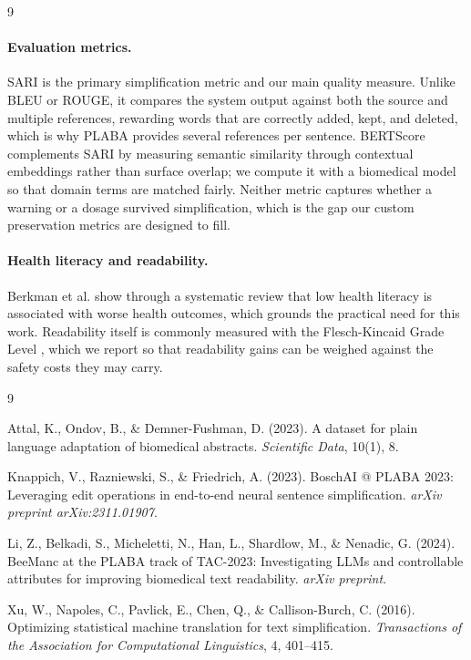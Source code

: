 \documentclass[11pt]{article}
\begin{document}
\begin{thebibliography}{9}
\paragraph{Evaluation metrics.}
SARI \cite{xu2016sari} is the primary simplification metric and our main quality
measure. Unlike BLEU or ROUGE, it compares the system output against both the
source and multiple references, rewarding words that are correctly added,
kept, and deleted, which is why PLABA provides several references per sentence.
BERTScore \cite{zhang2020bertscore} complements SARI by measuring semantic
similarity through contextual embeddings rather than surface overlap; we compute
it with a biomedical model so that domain terms are matched fairly. Neither
metric captures whether a warning or a dosage survived simplification, which is
the gap our custom preservation metrics are designed to fill.

\paragraph{Health literacy and readability.}
Berkman et al. \cite{berkman2011health} show through a systematic review that low
health literacy is associated with worse health outcomes, which grounds the
practical need for this work. Readability itself is commonly measured with the
Flesch-Kincaid Grade Level \cite{kincaid1975fkgl}, which we report so that
readability gains can be weighed against the safety costs they may carry.

\begin{thebibliography}{9}

Attal, K., Ondov, B., \& Demner-Fushman, D. (2023).
A dataset for plain language adaptation of biomedical abstracts.
\emph{Scientific Data}, 10(1), 8.

Knappich, V., Razniewski, S., \& Friedrich, A. (2023).
BoschAI @ PLABA 2023: Leveraging edit operations in end-to-end neural sentence
simplification. \emph{arXiv preprint arXiv:2311.01907}.

Li, Z., Belkadi, S., Micheletti, N., Han, L., Shardlow, M., \& Nenadic, G.
(2024). BeeManc at the PLABA track of TAC-2023: Investigating LLMs and
controllable attributes for improving biomedical text readability.
\emph{arXiv preprint}.

Xu, W., Napoles, C., Pavlick, E., Chen, Q., \& Callison-Burch, C. (2016).
Optimizing statistical machine translation for text simplification.
\emph{Transactions of the Association for Computational Linguistics}, 4,
401--415.


\end{thebibliography}
\end{thebibliography}
\end{document}
